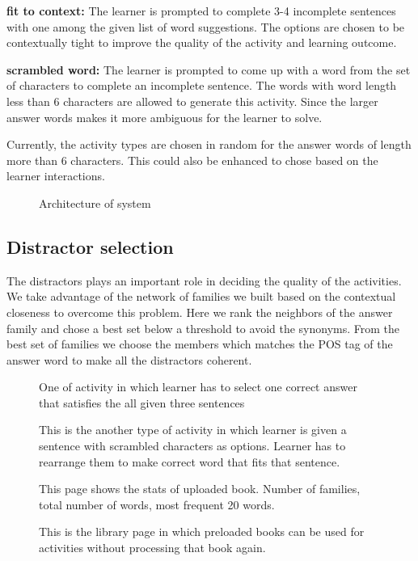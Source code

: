 \documentclass[11pt,a4paper]{article}
\begin{document}
\textbf{fit to context:} The learner is prompted to complete 3-4 incomplete
sentences with one among the given list of word suggestions. The options are
chosen to be contextually tight to improve the quality of the activity and
learning outcome.

\textbf{scrambled word:} The learner is prompted to come up with a word from the
set of characters to complete an incomplete sentence. The words with word length
less than 6 characters are allowed to generate this activity. Since the larger
answer words makes it more ambiguous for the learner to solve.

Currently, the activity types are chosen in random for the answer words of length
more than 6 characters. This could also be enhanced to chose based on the learner
interactions.

\begin{figure}
\begin{tcbraster}[raster columns=1, enhanced, blankest]
\caption{Architecture of system}

\end{tcbraster}
\end{figure}

\subsection{Distractor selection}
The distractors plays an important role in deciding the quality of the activities.
We take advantage of the network of families we built based on the contextual
closeness to overcome this problem. Here we rank the neighbors of the
answer family and chose a best set below a threshold to avoid the synonyms. From
the best set of families we choose the members which matches the POS tag of the
answer word to make all the distractors coherent.



\begin{figure}
\begin{tcbraster}[raster columns=1, enhanced, blankest]
\caption{One of activity in which learner has to select one correct answer that satisfies the all given three sentences}

\caption{This is the another type of activity in which learner is given a sentence with scrambled characters as options. Learner has to rearrange them to make correct word that fits that sentence.}

\caption{This page shows the stats of uploaded book. Number of families, total number of words, most frequent 20 words.}


\caption{This is the library page in which preloaded books can be used for activities without processing that book again.}

\end{tcbraster}
\end{figure}
\end{document}
